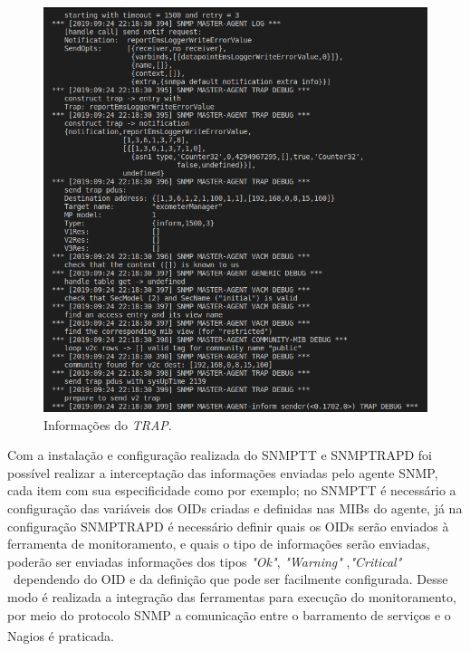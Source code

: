 \begin{figure}[h!]
	\begin{center}
	\includegraphics[scale = 0.75]{img/debugTrap.png}
	\caption{Informações do \textit{TRAP}.}
	\label{fun:fig:debugTrap}
	\end{center}
\end{figure}

Com a instalação e configuração realizada do \acrshort{SNMPTT} e SNMPTRAPD foi possível realizar a interceptação das informações enviadas pelo agente \acrshort{SNMP}, cada item com sua especificidade como por exemplo; no \acrshort{SNMPTT} é necessário a configuração das variáveis dos \acrshort{OID}s  criadas e definidas nas \acrshort{MIBs} do agente, já na configuração SNMPTRAPD é necessário definir quais os \acrshort{OID}s serão enviados à ferramenta de monitoramento, e quais o tipo de informações serão enviadas, poderão ser enviadas informações dos tipos  \textit{"Ok"}, \textit{"Warning"} ,\textit{"Critical"} \ dependendo do \acrshort{OID} e da definição que pode ser facilmente configurada. Desse modo é realizada a integração das ferramentas para execução do monitoramento, por meio do protocolo \acrshort{SNMP} a comunicação entre o barramento de serviços e o Nagios\textsuperscript{\textregistered} é praticada.  

